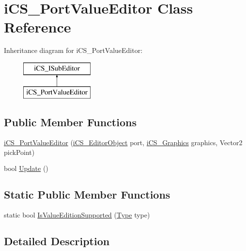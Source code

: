 \hypertarget{classi_c_s___port_value_editor}{\section{i\+C\+S\+\_\+\+Port\+Value\+Editor Class Reference}
\label{classi_c_s___port_value_editor}
}
Inheritance diagram for i\+C\+S\+\_\+\+Port\+Value\+Editor\+:\begin{figure}[H]
\begin{center}
\leavevmode
\includegraphics[height=2.000000cm]{classi_c_s___port_value_editor}
\end{center}
\end{figure}
\subsection*{Public Member Functions}
\begin{DoxyCompactItemize}
\item 
\hyperlink{classi_c_s___port_value_editor_a87dfc7ddc11f32b66cd8ca8e40f28465}{i\+C\+S\+\_\+\+Port\+Value\+Editor} (\hyperlink{classi_c_s___editor_object}{i\+C\+S\+\_\+\+Editor\+Object} port, \hyperlink{classi_c_s___graphics}{i\+C\+S\+\_\+\+Graphics} graphics, Vector2 pick\+Point)
\item 
bool \hyperlink{classi_c_s___port_value_editor_ad20b913c17ecf2d23f7291d94090cd7a}{Update} ()
\end{DoxyCompactItemize}
\subsection*{Static Public Member Functions}
\begin{DoxyCompactItemize}
\item 
static bool \hyperlink{classi_c_s___port_value_editor_a5622db6f50aa75dffb144b6896758a79}{Is\+Value\+Edition\+Supported} (\hyperlink{i_c_s___object_type_enum_8cs_ae6c3dd6d8597380b56d94908eb431547aa1fa27779242b4902f7ae3bdd5c6d508}{Type} type)
\end{DoxyCompactItemize}


\subsection{Detailed Description}


